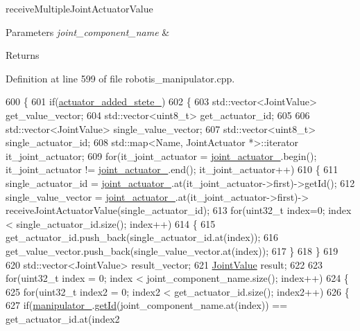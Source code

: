 receive\+Multiple\+Joint\+Actuator\+Value 


\begin{DoxyParams}{Parameters}
{\em joint\+\_\+component\+\_\+name} & \\
\hline
\end{DoxyParams}
\begin{DoxyReturn}{Returns}

\end{DoxyReturn}


Definition at line 599 of file robotis\+\_\+manipulator.\+cpp.


\begin{DoxyCode}
600 \{
601   \textcolor{keywordflow}{if}(\hyperlink{classrobotis__manipulator_1_1_robotis_manipulator_a02073b7982b992642b28acfa35a17769}{actuator\_added\_stete\_})
602   \{
603     std::vector<JointValue> get\_value\_vector;
604     std::vector<uint8\_t> get\_actuator\_id;
605 
606     std::vector<JointValue> single\_value\_vector;
607     std::vector<uint8\_t> single\_actuator\_id;
608     std::map<Name, JointActuator *>::iterator it\_joint\_actuator;
609     \textcolor{keywordflow}{for}(it\_joint\_actuator = \hyperlink{classrobotis__manipulator_1_1_robotis_manipulator_a54dfb941bb2682d321daea25a373ab1c}{joint\_actuator\_}.begin(); it\_joint\_actuator != 
      \hyperlink{classrobotis__manipulator_1_1_robotis_manipulator_a54dfb941bb2682d321daea25a373ab1c}{joint\_actuator\_}.end(); it\_joint\_actuator++)
610     \{
611       single\_actuator\_id = \hyperlink{classrobotis__manipulator_1_1_robotis_manipulator_a54dfb941bb2682d321daea25a373ab1c}{joint\_actuator\_}.at(it\_joint\_actuator->first)->getId();
612       single\_value\_vector = \hyperlink{classrobotis__manipulator_1_1_robotis_manipulator_a54dfb941bb2682d321daea25a373ab1c}{joint\_actuator\_}.at(it\_joint\_actuator->first)->
      receiveJointActuatorValue(single\_actuator\_id);
613       \textcolor{keywordflow}{for}(uint32\_t index=0; index < single\_actuator\_id.size(); index++)
614       \{
615         get\_actuator\_id.push\_back(single\_actuator\_id.at(index));
616         get\_value\_vector.push\_back(single\_value\_vector.at(index));
617       \}
618     \}
619 
620     std::vector<JointValue> result\_vector;
621     \hyperlink{structrobotis__manipulator_1_1_point}{JointValue} result;
622 
623     \textcolor{keywordflow}{for}(uint32\_t index = 0; index < joint\_component\_name.size(); index++)
624     \{
625       \textcolor{keywordflow}{for}(uint32\_t index2 = 0; index2 < get\_actuator\_id.size(); index2++)
626       \{
627         \textcolor{keywordflow}{if}(\hyperlink{classrobotis__manipulator_1_1_robotis_manipulator_a5b2df4a3b3ee7f408cb1d0eaf61644dc}{manipulator\_}.\hyperlink{classrobotis__manipulator_1_1_manipulator_a60db34ef6a62e0b15aa36f9b1571640d}{getId}(joint\_component\_name.at(index)) == get\_actuator\_id.at(index2

\end{DoxyCode}

